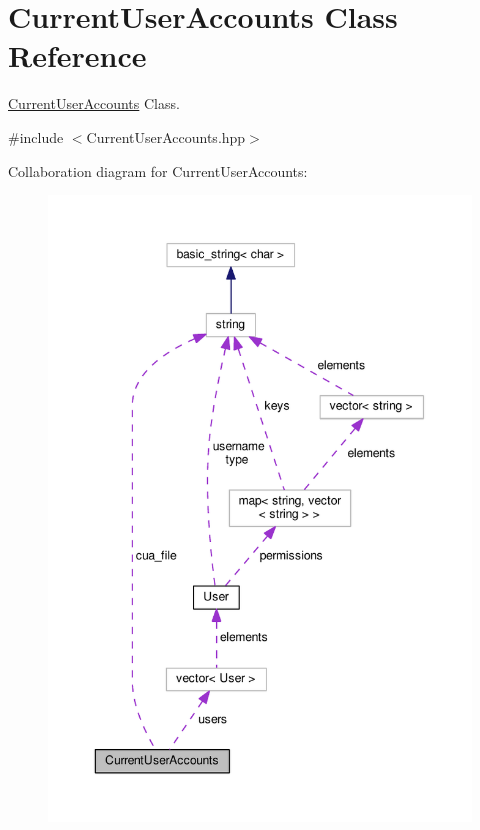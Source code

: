 \hypertarget{class_current_user_accounts}{\section{Current\-User\-Accounts Class Reference}
\label{class_current_user_accounts}
}


\hyperlink{class_current_user_accounts}{Current\-User\-Accounts} Class.  




{\ttfamily \#include $<$Current\-User\-Accounts.\-hpp$>$}



Collaboration diagram for Current\-User\-Accounts\-:\nopagebreak
\begin{figure}[H]
\begin{center}
\leavevmode
\includegraphics[width=350pt]{class_current_user_accounts__coll__graph}
\end{center}
\end{figure}
